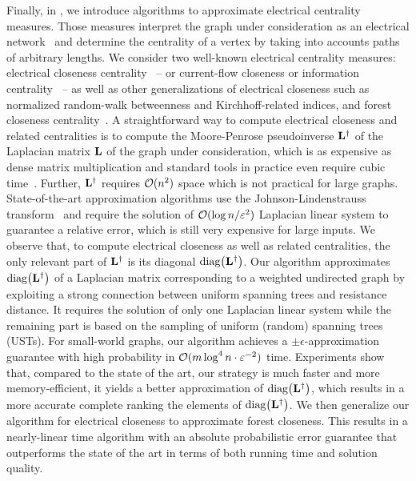 Finally, in , we introduce algorithms to
approximate electrical centrality measures.
Those measures interpret the graph under consideration as an electrical
network~\cite{lovasz1993random} and determine the centrality of a vertex by
taking into accounts paths of arbitrary lengths.
We consider two well-known electrical centrality measures: electrical
closeness centrality~\cite{DBLP:conf/stacs/BrandesF05} -- or
current-flow closeness or information centrality~\cite{stephenson1989rethinking} --
as well as other generalizations of electrical closeness such as normalized
random-walk betweenness and Kirchhoff-related indices, and forest closeness
centrality~\cite{DBLP:conf/icdm/JinBZ19}.
A straightforward way to compute electrical closeness and related centralities
is to compute the Moore-Penrose pseudoinverse $\mathbf{L}^\dagger$ of the Laplacian
matrix $\mathbf{L}$ of the graph under consideration, which is as expensive as dense
matrix multiplication and standard tools in practice even require cubic
time~\cite{DBLP:conf/cocoa/RanjanZB14}. Further, $\mathbf{L}^\dagger$ requires $\mathcal{O}(n^2)$
space which is not practical for large graphs.
State-of-the-art approximation algorithms use the Johnson-Lindenstrauss
transform~\cite{johnson1984extensions} and require the solution of
$\mathcal{O}(\log n/\varepsilon^2)$ Laplacian linear system to guarantee a relative
error, which is still very expensive for large inputs.
We observe that, to compute electrical closeness as well as related centralities,
the only relevant part of $\mathbf{L}^\dagger$ is its diagonal $\diag{\Linv}$.
Our algorithm approximates $\diag{\Linv}$ of a Laplacian matrix \Lapl
corresponding to a weighted undirected graph by exploiting a strong
connection between uniform spanning trees and resistance distance.
It requires the solution of only
one Laplacian linear system while the remaining part is based on the sampling
of uniform (\ie random) spanning trees (USTs). For small-world graphs,
our algorithm achieves a $\pm\epsilon$-approximation guarantee with high probability
in $\mathcal{O}(m\log^4n \cdot \varepsilon^{-2})$ time.
Experiments show that, compared to the state of the art, our strategy is much
faster and more memory-efficient, it yields a better approximation of $\diag{\Linv}$,
which results in a more accurate complete ranking the elements of $\diag{\Linv}$.
We then generalize our algorithm for electrical closeness to approximate forest
closeness. This results in a nearly-linear time algorithm with an absolute
probabilistic error guarantee that outperforms the state of the art in terms
of both running time and solution quality.
